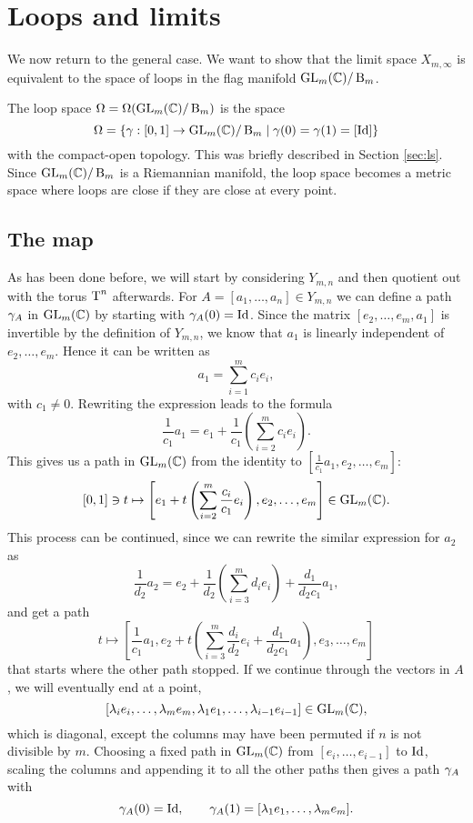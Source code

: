 
\chapter{Loops and limits} 
\label{chap:loekker}

We now return to the general case. We want to show that the limit
space
$X_{m,\infty}$ is equivalent to the space of loops in the flag
manifold $\operatorname{GL}_{m}(\mathbb{C})/\operatorname{B}_{m}$.

\begin{definition}
  The loop space $\Omega = \Omega(\operatorname{GL}_{m}(\mathbb{C})/\operatorname{B}_{m})$ is the space
  \[ \Omega = \left\{ \gamma : [0,1] \to \operatorname{GL}_{m}(\mathbb{C})/\operatorname{B}_{m} \mid \gamma(0) = \gamma(1) =
    [\operatorname{Id}] \right\} \]
  with the compact-open topology. This was briefly described in
  Section \ref{sec:ls}. Since $\operatorname{GL}_{m}(\mathbb{C})/\operatorname{B}_{m}$ is a Riemannian manifold, the
  loop space becomes a metric space where loops are close if they are
  close at every point.
\end{definition}

\section{The map}

As has been done before, we will start by considering $Y_{m,n}$ and
then quotient out with the torus $\operatorname{T}^n$ afterwards.
For $A = [a_1,\dots,a_n]\in Y_{m,n}$ we
can define a path $ \gamma_A$ in $\operatorname{GL}_m(\mathbb{C})$ by starting with
$\gamma_A(0) = \operatorname{Id}$. Since the matrix $[e_2,\dots,e_m,a_1]$ is
invertible by the definition of $Y_{m,n}$, we know that $a_1$ is
linearly independent of $e_2,\dots,e_m$. Hence it can be written as
\[ a_1 = \sum_{i=1}^m c_i e_i, \]
with $c_1 \neq 0$. Rewriting the expression leads to the formula
\[  \frac{1}{c_1} a_1= e_1 + \frac{1}{c_1} \left(\sum_{i=2}^m c_i
  e_i\right). \]
This gives us a path in $\operatorname{GL}_m(\mathbb{C})$ from the identity to
$\left[\frac{1}{c_1} a_1,e_2,\dots,e_m\right]$:
\[ [0,1]\ni t \mapsto \left[ e_1 + t\left(\sum_{i=2}^m
    \frac{c_i}{c_1}e_i\right),e_2,\dots,e_m \right] \in \operatorname{GL}_m(\mathbb{C}). \]
This process can be continued, since we can rewrite the similar
expression for $a_2$ as
\[ \frac{1}{d_2}a_2 = e_2 + \frac{1}{d_2}\left(\sum_{i=3}^m d_i
  e_i\right) + \frac{d_1}{d_2c_1}a_1, \]
and get a path
\[ t\mapsto \left[\frac{1}{c_1}a_1,e_2+t\left(\sum_{i=3}^m
    \frac{d_i}{d_2}e_i +
    \frac{d_1}{d_2c_1}a_1\right),e_3,\dots,e_m\right] \]
that starts where the other path stopped. If we continue through the
vectors in $A$, we will eventually end at a point,
\[ [\lambda_i e_i,\dots,\lambda_me_m,\lambda_1e_1,\dots,\lambda_{i-1}e_{i-1}]\in \operatorname{GL}_m(\mathbb{C}), \]
which is diagonal, except the columns may have been
permuted if $n$ is not divisible by $m$. Choosing a fixed path in
$\operatorname{GL}_m(\mathbb{C})$ from $[e_i,\dots,e_{i-1}]$ to $\operatorname{Id}$, scaling the columns and
appending it to all the other paths then gives a path $ \gamma_A$ with
\[  \gamma_A(0) = \operatorname{Id}, \qquad \gamma_A(1) =
[\lambda_1e_1,\dots,\lambda_me_m]. \]

